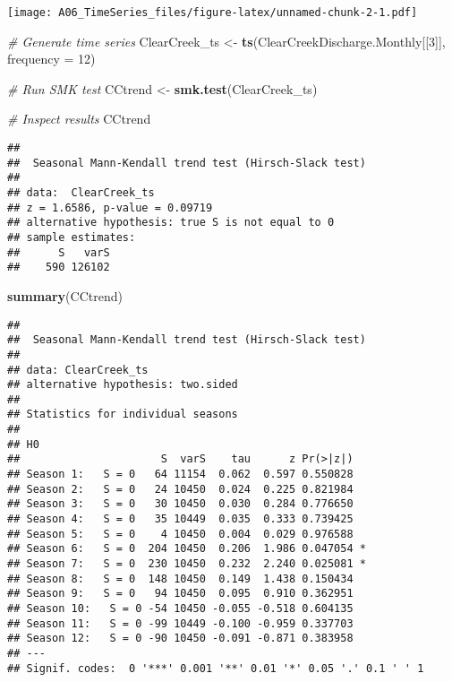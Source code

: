 \documentclass[]{article}
\newenvironment{Shaded}{\begin{snugshade}}{\end{snugshade}}
\newcommand{\CommentTok}[1]{\textcolor[rgb]{0.56,0.35,0.01}{\textit{#1}}}
\newcommand{\DataTypeTok}[1]{\textcolor[rgb]{0.13,0.29,0.53}{#1}}
\newcommand{\DecValTok}[1]{\textcolor[rgb]{0.00,0.00,0.81}{#1}}
\newcommand{\KeywordTok}[1]{\textcolor[rgb]{0.13,0.29,0.53}{\textbf{#1}}}
\newcommand{\NormalTok}[1]{#1}
\newcommand{\StringTok}[1]{\textcolor[rgb]{0.31,0.60,0.02}{#1}}
\begin{document}
\texttt{[image: A06\_TimeSeries\_files/figure-latex/unnamed-chunk-2-1.pdf]}

\begin{Shaded}
\begin{Highlighting}[]
\CommentTok{# Generate time series}
\NormalTok{ClearCreek_ts <-}\StringTok{ }\KeywordTok{ts}\NormalTok{(ClearCreekDischarge.Monthly[[}\DecValTok{3}\NormalTok{]], }\DataTypeTok{frequency =} \DecValTok{12}\NormalTok{)}

\CommentTok{# Run SMK test}
\NormalTok{CCtrend <-}\StringTok{ }\KeywordTok{smk.test}\NormalTok{(ClearCreek_ts)}

\CommentTok{# Inspect results}
\NormalTok{CCtrend}
\end{Highlighting}
\end{Shaded}

\begin{verbatim}
## 
##  Seasonal Mann-Kendall trend test (Hirsch-Slack test)
## 
## data:  ClearCreek_ts
## z = 1.6586, p-value = 0.09719
## alternative hypothesis: true S is not equal to 0
## sample estimates:
##      S   varS 
##    590 126102
\end{verbatim}

\begin{Shaded}
\begin{Highlighting}[]
\KeywordTok{summary}\NormalTok{(CCtrend)}
\end{Highlighting}
\end{Shaded}

\begin{verbatim}
## 
##  Seasonal Mann-Kendall trend test (Hirsch-Slack test)
## 
## data: ClearCreek_ts
## alternative hypothesis: two.sided
## 
## Statistics for individual seasons
## 
## H0
##                      S  varS    tau      z Pr(>|z|)  
## Season 1:   S = 0   64 11154  0.062  0.597 0.550828  
## Season 2:   S = 0   24 10450  0.024  0.225 0.821984  
## Season 3:   S = 0   30 10450  0.030  0.284 0.776650  
## Season 4:   S = 0   35 10449  0.035  0.333 0.739425  
## Season 5:   S = 0    4 10450  0.004  0.029 0.976588  
## Season 6:   S = 0  204 10450  0.206  1.986 0.047054 *
## Season 7:   S = 0  230 10450  0.232  2.240 0.025081 *
## Season 8:   S = 0  148 10450  0.149  1.438 0.150434  
## Season 9:   S = 0   94 10450  0.095  0.910 0.362951  
## Season 10:   S = 0 -54 10450 -0.055 -0.518 0.604135  
## Season 11:   S = 0 -99 10449 -0.100 -0.959 0.337703  
## Season 12:   S = 0 -90 10450 -0.091 -0.871 0.383958  
## ---
## Signif. codes:  0 '***' 0.001 '**' 0.01 '*' 0.05 '.' 0.1 ' ' 1
\end{verbatim}
\end{document}
